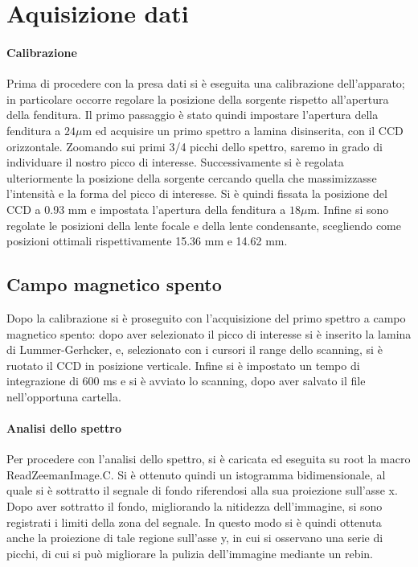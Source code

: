 \documentclass{article}
\begin{document}
	\section*{Aquisizione dati}
	
	\paragraph{Calibrazione}
	Prima di procedere con la presa dati si è eseguita una calibrazione 
	dell'apparato; in particolare occorre regolare la posizione 
	della sorgente rispetto all'apertura della fenditura.
	Il primo passaggio è stato quindi impostare l'apertura della fenditura 
	a $24 \mu$m ed acquisire un primo spettro a lamina disinserita, con il 
	CCD orizzontale. Zoomando sui primi 3/4 picchi dello spettro, saremo
	in grado di individuare il nostro picco di interesse.
	Successivamente si è regolata ulteriormente la posizione della sorgente 
	cercando quella che massimizzasse l'intensità e la forma del picco di 
	interesse.
	Si è quindi fissata la posizione del CCD a 0.93 mm e impostata l'apertura 
	della fenditura a $18 \mu$m.
	Infine si sono regolate le posizioni della lente focale e della lente 
	condensante, scegliendo come posizioni ottimali rispettivamente 15.36 mm 
	e 14.62 mm.


	\subsection*{Campo magnetico spento}

	Dopo la calibrazione si è proseguito con l'acquisizione del primo 
	spettro a campo magnetico spento: dopo aver selezionato il picco di 
	interesse si è inserito la lamina di Lummer-Gerhcker, e, selezionato 
	con i cursori il range dello scanning, si è ruotato il CCD
	in posizione verticale.
	Infine si è impostato un tempo di integrazione di 600 ms e si è avviato
	lo scanning, dopo aver salvato il file nell'opportuna cartella.


	\paragraph{Analisi dello spettro}
	Per procedere con l'analisi dello spettro, si è caricata ed eseguita su root la macro ReadZeemanImage.C. 
	Si è ottenuto quindi un istogramma bidimensionale, al quale si è sottratto il segnale di fondo riferendosi alla sua proiezione sull’asse x.
	Dopo aver sottratto il fondo, migliorando la nitidezza dell'immagine, si sono registrati i limiti della zona del segnale. 
	In questo modo si è quindi ottenuta anche la proiezione di tale regione sull’asse y, in cui si osservano una serie di picchi, 
	di cui si può migliorare la pulizia dell'immagine mediante un rebin.
\end{document}
